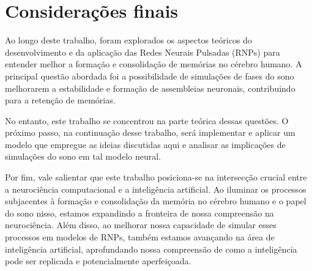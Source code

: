 \section{Considerações finais}

Ao longo deste trabalho, foram explorados os aspectos teóricos do desenvolvimento e da aplicação das Redes Neurais Pulsadas
(RNPs) para entender melhor a formação e consolidação de memórias no cérebro humano. A principal questão abordada foi a
possibilidade de simulações de fases do sono melhorarem a estabilidade e formação de assembleias neuronais, contribuindo para a
retenção de memórias. 

No entanto, este trabalho se concentrou na parte teórica dessas questões. O próximo passo, na continuação desse trabalho, será
implementar e aplicar um modelo que empregue as ideias discutidas aqui e analisar as implicações de simulações do sono em tal
modelo neural.

Por fim, vale salientar que este trabalho posiciona-se na intersecção crucial entre a neurociência computacional e a inteligência
artificial. Ao iluminar os processos subjacentes à formação e consolidação da memória no cérebro humano e o papel do sono nisso,
estamos expandindo a fronteira de nossa compreensão na neurociência. Além disso, ao melhorar nossa capacidade de simular esses
processos em modelos de RNPs, também estamos avançando na área de inteligência artificial, aprofundando nossa compreensão de como
a inteligência pode ser replicada e potencialmente aperfeiçoada. 

